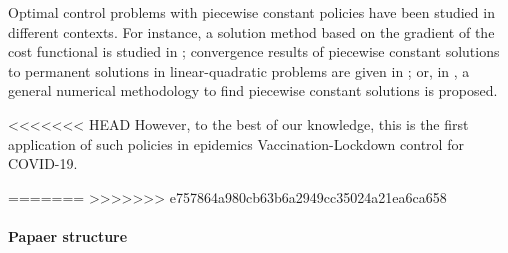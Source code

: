 Optimal control problems with piecewise constant policies have been studied in different contexts. For instance, a solution method based on the gradient of the cost functional is studied in \cite{MR3223602}; convergence results of  piecewise constant solutions to permanent solutions in linear-quadratic problems are given in \cite{MR3627992}; or, in \cite{CANTUNetAl}, a general numerical methodology to find piecewise constant solutions is proposed. 

<<<<<<< HEAD
However, to the best of our knowledge, this is the first application of such
policies in epidemics Vaccination-Lockdown control for COVID-19.

=======
>>>>>>> e757864a980cb63b6a2949cc35024a21ea6ca658
\paragraph{Papaer structure}